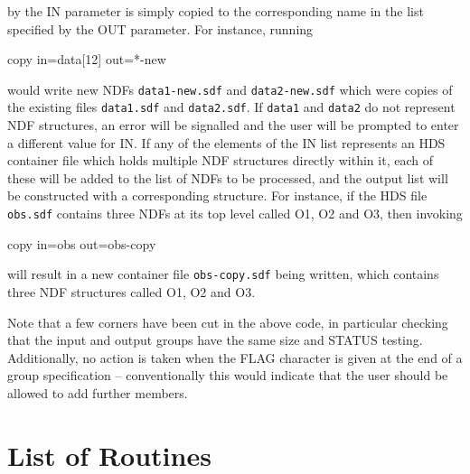 \documentclass[twoside,11pt,nolof]{starlink}
\begin{document}
by the IN parameter is simply copied to the corresponding name in the
list specified by the OUT parameter.  For instance, running
\begin{small}
\begin{terminalv}
copy in=data[12] out=*-new
\end{terminalv}
\end{small}
would write new NDFs \texttt{data1-new.sdf} and \texttt{data2-new.sdf}
which were copies of the existing files \texttt{data1.sdf} and \texttt{data2.sdf}.
If \texttt{data1} and \texttt{data2} do not represent NDF structures,
an error will be signalled and the user will be prompted to enter
a different value for IN.
If any of the elements of the IN list represents an HDS container file
which holds multiple NDF structures directly within it, each of these
will be added to the list of NDFs to be processed, and the
output list will be constructed with a corresponding structure.
For instance, if the HDS file \texttt{obs.sdf} contains three NDFs at
its top level called O1, O2 and O3, then invoking
\begin{small}
\begin{terminalv}
copy in=obs out=obs-copy
\end{terminalv}
\end{small}
will result in a new container file \texttt{obs-copy.sdf} being written,
which contains three NDF structures called O1, O2 and O3.

Note that a few corners have been cut in the above code,
in particular checking that the input and output groups have the
same size and STATUS testing.  Additionally, no action is taken
when the FLAG character is given at the end of a group specification --
conventionally this would indicate that the user should be allowed
to add further members.

\appendix

\section{List of Routines}
\end{document}
